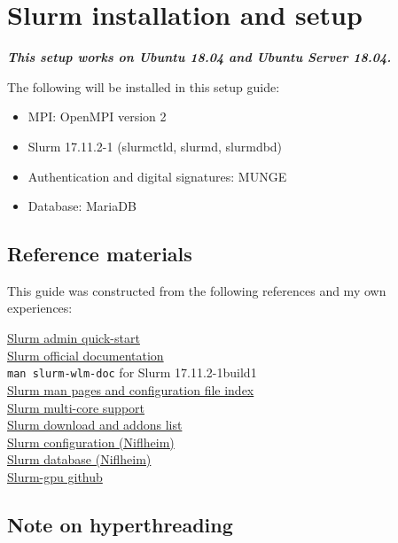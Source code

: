 \chapter{Slurm installation and setup} \label{ch:slurmsetup}

\textbf{\emph{This setup works on Ubuntu 18.04 and Ubuntu Server 18.04.}}

The following will be installed in this setup guide:

\begin{itemize}
  \item MPI: OpenMPI version 2
  \item Slurm 17.11.2-1 (slurmctld, slurmd, slurmdbd)
  \item Authentication and digital signatures: MUNGE
  \item Database: MariaDB
\end{itemize}

\section{Reference materials} \label{sec:slurmguides}

This guide was constructed from the following references and my own experiences:

\href{https://slurm.schedmd.com/quickstart_admin.html}{Slurm admin quick-start} \\
\indent \href{https://slurm.schedmd.com/documentation.html}{Slurm official documentation} \\
\indent \texttt{man slurm-wlm-doc} for Slurm 17.11.2-1build1 \\
\indent \href{https://slurm.schedmd.com/man_index.html}{Slurm man pages and configuration file index} \\
\indent \href{https://slurm.schedmd.com/mc_support.html}{Slurm multi-core support} \\
\indent \href{https://slurm.schedmd.com/download.html}{Slurm download and addons list} \\
\indent \href{https://wiki.fysik.dtu.dk/niflheim/Slurm_configuration}{Slurm configuration (Niflheim)} \\
\indent \href{https://wiki.fysik.dtu.dk/niflheim/Slurm_database}{Slurm database (Niflheim)} \\
\indent \href{https://github.com/dholt/slurm-gpu}{Slurm-gpu github}

\section{Note on hyperthreading} \label{sec:slurmHT}

